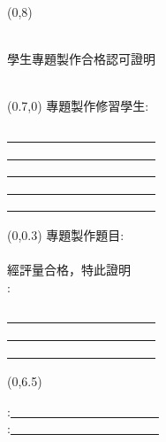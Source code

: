 \documentclass[UTF8]{ctexart}
\newcommand{\eigh}{\fontsize{18pt}{\baselineskip}\selectfont}%
\newcommand{\fourteen}{\fontsize{14pt}{\baselineskip}\selectfont}%
\begin{document}
    {\begin{textblock}{12}(0,8)
    {\begin{center}
    \noindent \kaishu \eigh {}
    \end{center}}
    \end{textblock}}
    \newpage
    {\begin{center}
    {\renewcommand \baselinestretch {1.4}  \kaishu \eigh {國立虎尾科技大學 \qquad 機械設計工程系}\\
    {學生專題製作合格認可證明}\\
    \hspace*{\fill} \\ %
    \par}
     \end{center}}
    {\begin{textblock}{60}(0.7,0)
    \noindent \kaishu \fourteen 專題製作修習學生\enspace:\quad
    {\begin{minipage}[t]{10em}\underline{　　　　　　　　　　　　}\\ \underline{　　　　　　　　　　　　}\\ \underline{　　　　　　　　　　　　}\\ \underline{　　　　　　　　　　　　}\\ \underline{　　　　　　　　　　　　}\\ %
    \end{minipage}}
    {\begin{textblock}{30}(0,0.3)
    \noindent \kaishu \fourteen 專題製作題目\enspace:\quad
    \hspace*{\fill} \\
    \hspace*{\fill} \\
    \noindent \kaishu \fourteen 經評量合格，特此證明
    \hspace*{\fill} \\
    \noindent \kaishu \fourteen {}\enspace:\quad
    {\begin{minipage}[t]{6em} \underline{　　　　　　　　　　　　}\\ \underline{　　　　　　　　　　　　}\\ \underline{　　　　　　　　　　　　}\\
    \end{minipage}}
    \end{textblock}}
    {\begin{textblock}{10}(0,6.5)
    {\begin{flushleft}
    \kaishu \fourteen {}\enspace:\quad \underline{　　　　　　　　　　　　}\\
    \kaishu \fourteen {}\enspace:\quad \underline{　　　　　　　　　　　　}\\
    \hspace*{\fill} \\
    \kaishu \fourteen {}\qquad{}\qquad{}\qquad{}
    \end{flushleft}}
    \end{textblock}}
    \end{textblock}}
\end{document}
